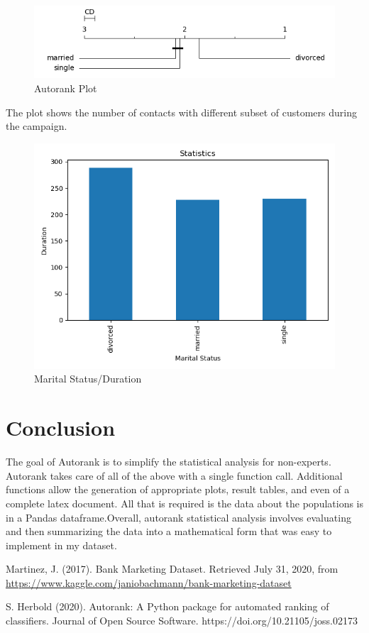 \documentclass[12pt]{article}
\begin{document}
\begin{figure}[!htbp]
	\centering
	\includegraphics[width=15 cm]{stat_auto_rank.png}
	\caption{Autorank Plot}
\end{figure}

\newpage
The plot shows the number of contacts with different subset of customers during the campaign.
\begin{figure}[!htbp]
	\centering
	\includegraphics[width=15 cm]{mean.png}
	\caption{Marital Status/Duration}
\end{figure}


\section{Conclusion}
The goal of Autorank is to simplify the statistical analysis for non-experts. Autorank takes care of all of the above with a single function call. Additional functions allow the generation of appropriate plots, result tables, and even of a complete latex document. All that is required is the data about the populations is in a Pandas dataframe.Overall, autorank statistical analysis involves evaluating and then summarizing the data into a mathematical form that was easy to implement in my dataset. 
\newpage

\begin{thebibliography}{999}

	Martinez, J. (2017). Bank Marketing Dataset. Retrieved July 31, 2020, from {\url{https://www.kaggle.com/janiobachmann/bank-marketing-dataset}}

   
	S. Herbold (2020). Autorank: A Python package for automated ranking of classifiers. Journal of Open Source Software. https://doi.org/10.21105/joss.02173


\end{thebibliography}
\end{document}
